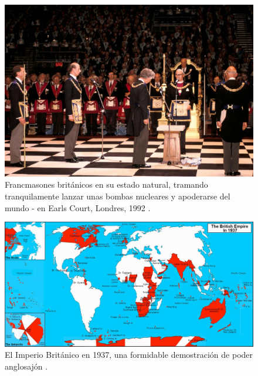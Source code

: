 \documentclass[10pt,twocolumn,letterpaper]{article}
\begin{document}
\begin{figure}[b]
\begin{center}

\includegraphics[width=1\linewidth]{freemason.jpg}
\end{center}
   \caption{Francmasones británicos en su estado natural, tramando tranquilamente lanzar unas bombas nucleares y apoderarse del mundo - en Earls Court, Londres, 1992 \cite{5}.}
\label{fig:1}
\label{fig:onecol}
\end{figure}

\begin{figure}[t]
\begin{center}
\includegraphics[width=1\textwidth]{british.jpg}
\end{center}
   \caption{El Imperio Británico en 1937, una formidable demostración de poder anglosajón \cite{14}.}
   \label{fig:2}
\end{figure}
\end{document}
